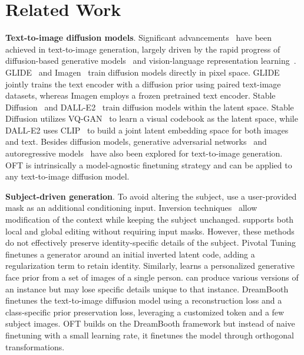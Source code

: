 \section{Related Work}

\textbf{Text-to-image diffusion models}. Significant advancements~\cite{saharia2022photorealistic,ramesh2022hierarchical,rombach2022high,gu2022vector,nichol2022glide} have been achieved in text-to-image generation, largely driven by the rapid progress of diffusion-based generative models~\cite{ho2020denoising,song2021score,song2021denoising,dhariwal2021diffusion} and vision-language representation learning~\cite{su2020vlbert,lu2019vilbert,radford2021learning,wang2021simvlm,li2022blip,li2023blip,alayrac2022flamingo,schuhmann2022laion}. GLIDE~\cite{nichol2022glide} and Imagen~\cite{saharia2022photorealistic} train diffusion models directly in pixel space. GLIDE jointly trains the text encoder with a diffusion prior using paired text-image datasets, whereas Imagen employs a frozen pretrained text encoder. Stable Diffusion~\cite{rombach2022high} and DALL-E2~\cite{ramesh2022hierarchical} train diffusion models within the latent space. Stable Diffusion utilizes VQ-GAN~\cite{esser2021taming} to learn a visual codebook as the latent space, while DALL-E2 uses CLIP~\cite{radford2021learning} to build a joint latent embedding space for both images and text. Besides diffusion models, generative adversarial networks~\cite{reed2016generative,zhang2017stackgan,xu2018attngan,li2019controllable} and autoregressive models~\cite{ramesh2021zero,ding2021cogview,wu2022nuwa,yuscaling} have also been explored for text-to-image generation. OFT is intrinsically a model-agnostic finetuning strategy and can be applied to any text-to-image diffusion model.

\textbf{Subject-driven generation}. To avoid altering the subject, \cite{avrahami2022blended,nichol2022glide} use a user-provided mask as an additional conditioning input. Inversion techniques~\cite{choi2021ilvr,dhariwal2021diffusion,ramesh2022hierarchical,gal2022image} allow modification of the context while keeping the subject unchanged. \cite{hertz2022prompt} supports both local and global editing without requiring input masks. However, these methods do not effectively preserve identity-specific details of the subject. Pivotal Tuning~\cite{roich2022pivotal} finetunes a generator around an initial inverted latent code, adding a regularization term to retain identity. Similarly, \cite{nitzan2022mystyle} learns a personalized generative face prior from a set of images of a single person. \cite{casanova2021instance} can produce various versions of an instance but may lose specific details unique to that instance. DreamBooth~\cite{ruiz2023dreambooth} finetunes the text-to-image diffusion model using a reconstruction loss and a class-specific prior preservation loss, leveraging a customized token and a few subject images. OFT builds on the DreamBooth framework but instead of naive finetuning with a small learning rate, it finetunes the model through orthogonal transformations.

